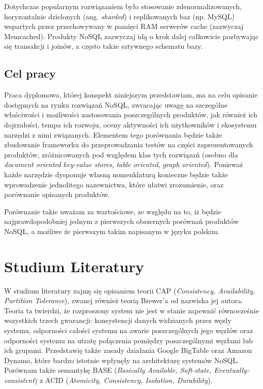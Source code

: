 \documentclass[a4paper,11pt]{article}
\begin{document}
Dotychczas popularnym rozwiązaniem było stosowanie zdenormalizowanych,
horyzontalnie dzielonych (ang. \emph{sharded}) i replikowanych baz (np. MySQL)
wspartych przez przechowywany w pamięci RAM serwerów cache (zazwyczaj
Memcached). Produkty NoSQL zazwyczaj idą o krok dalej całkowicie pozbywając się
transakcji i joinów, a często także sztywnego schematu bazy.

\subsection*{Cel pracy}
Praca dyplomowa, której konspekt niniejszym przedstawiam, ma na celu opisanie
dostępnych na rynku rozwiązań NoSQL, zwracając uwagę na szczególne właściwości
i możliwości zastosowania poszczególnych produktów, jak również ich
dojrzałości, tempa ich rozwoju, oceny aktywności ich użytkowników i ekosystemu
narzędzi z nimi związanych. Elementem tego porównania będzie także zbudowanie
frameworku do przeprowadzania testów na części zaprezentowanych produktów,
zróżnicowanych pod względem klas tych rozwiązań (osobno dla \emph{document
oriented} \emph{key-value stores}, \emph{table oriented}, \emph{graph
oriented}). Ponieważ każde narzędzie dysponuje własną nomenklaturą konieczne
będzie także wprowadzenie jednolitego nazewnictwa, które ułatwi zrozumienie,
oraz porównanie opisanych produktów.

Porównanie takie uważam za wartościowe, ze względu na to, iż będzie
najprawdopodobniej jednym z pierwszych obszernych porównań produktów NoSQL, a
możliwe że pierwszym takim napisanym w języku polskim.
  
\section{Studium Literatury}
W studium literatury zajmę się opisaniem teorii CAP\cite{brewers-conjecture}
(\emph{Consistency, Availability, Partition Tolerance}), zwanej również
teorią Brewer'a od nazwiska jej autora. Teoria ta twierdzi, że rozproszony
system nie jest w stanie zapewnić równocześnie wszystkich trzech gwarancji:
konsystencji danych widzianych przez węzły systemu, odporności całości systemu
na awarie poszczególnych jego węzłów oraz odporności systemu na utratę
połączenia pomiędzy poszczególnymi węzłami lub ich grupami. Przedstawię także
zasady działania Google BigTable\cite{google-bigtable} oraz Amazon
Dynamo\cite{amazon-dynamo}, które bardzo istotnie wpłynęły na architekturę
systemów NoSQL. Porównam także semantykę BASE (\emph{Basically Available,
Soft-state, Eventually-consistent}) z ACID (\emph{Atomicity, Consistency,
Isolation, Durability}).
\end{document}
